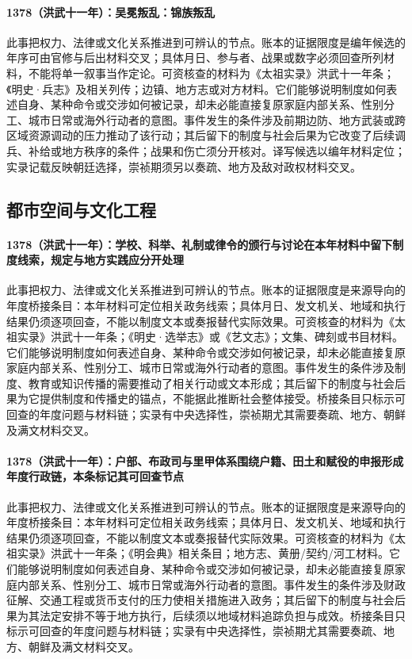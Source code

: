 \paragraph{1378（洪武十一年）：吴冕叛乱：锦族叛乱} 此事把权力、法律或文化关系推进到可辨认的节点。账本的证据限度是编年候选的年序可由官修与后出材料交叉；具体月日、参与者、战果或数字必须回查所列材料，不能将单一叙事当作定论。可资核查的材料为《太祖实录》洪武十一年条；《明史·兵志》及相关列传；边镇、地方志或对方材料。它们能够说明制度如何表述自身、某种命令或交涉如何被记录，却未必能直接复原家庭内部关系、性别分工、城市日常或海外行动者的意图。事件发生的条件涉及前期边防、地方武装或跨区域资源调动的压力推动了该行动；其后留下的制度与社会后果为它改变了后续调兵、补给或地方秩序的条件；战果和伤亡须分开核对。译写候选以编年材料定位；实录记载反映朝廷选择，崇祯期须另以奏疏、地方及敌对政权材料交叉。

\subsection{都市空间与文化工程}

\paragraph{1378（洪武十一年）：学校、科举、礼制或律令的颁行与讨论在本年材料中留下制度线索，规定与地方实践应分开处理} 此事把权力、法律或文化关系推进到可辨认的节点。账本的证据限度是来源导向的年度桥接条目：本年材料可定位相关政务线索；具体月日、发文机关、地域和执行结果仍须逐项回查，不能以制度文本或奏报替代实际效果。可资核查的材料为《太祖实录》洪武十一年条；《明史·选举志》或《艺文志》；文集、碑刻或书目材料。它们能够说明制度如何表述自身、某种命令或交涉如何被记录，却未必能直接复原家庭内部关系、性别分工、城市日常或海外行动者的意图。事件发生的条件涉及制度、教育或知识传播的需要推动了相关行动或文本形成；其后留下的制度与社会后果为它提供制度和传播史的锚点，不能据此推断社会整体接受。桥接条目只标示可回查的年度问题与材料链；实录有中央选择性，崇祯期尤其需要奏疏、地方、朝鲜及满文材料交叉。

\paragraph{1378（洪武十一年）：户部、布政司与里甲体系围绕户籍、田土和赋役的申报形成年度行政链，本条标记其可回查节点} 此事把权力、法律或文化关系推进到可辨认的节点。账本的证据限度是来源导向的年度桥接条目：本年材料可定位相关政务线索；具体月日、发文机关、地域和执行结果仍须逐项回查，不能以制度文本或奏报替代实际效果。可资核查的材料为《太祖实录》洪武十一年条；《明会典》相关条目；地方志、黄册/契约/河工材料。它们能够说明制度如何表述自身、某种命令或交涉如何被记录，却未必能直接复原家庭内部关系、性别分工、城市日常或海外行动者的意图。事件发生的条件涉及财政征解、交通工程或货币支付的压力使相关措施进入政务；其后留下的制度与社会后果为其法定安排不等于地方执行，后续须以地域材料追踪负担与成效。桥接条目只标示可回查的年度问题与材料链；实录有中央选择性，崇祯期尤其需要奏疏、地方、朝鲜及满文材料交叉。


